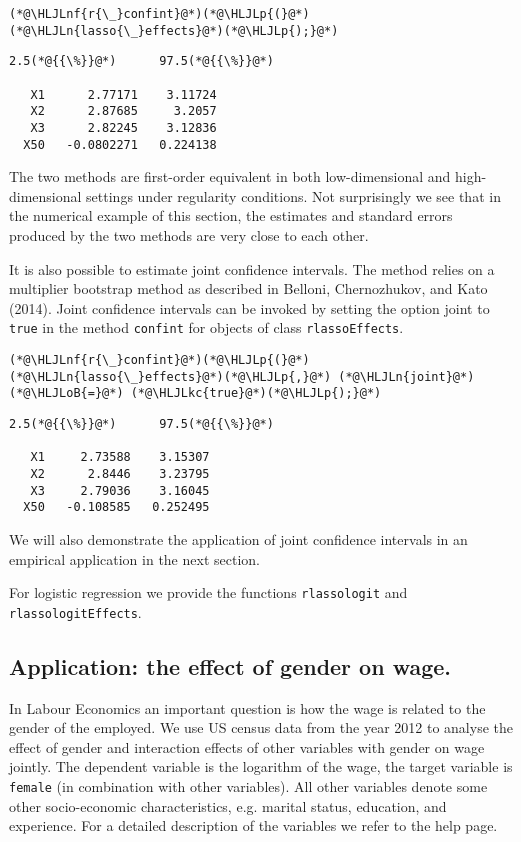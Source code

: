\documentclass[12pt,a4paper]{article}
\newcommand{\HLJLkc}[1]{\textcolor[RGB]{59,151,46}{\textit{#1}}}
\newcommand{\HLJLn}[1]{#1}
\newcommand{\HLJLnf}[1]{\textcolor[RGB]{66,102,213}{#1}}
\newcommand{\HLJLoB}[1]{\textcolor[RGB]{102,102,102}{\textbf{#1}}}
\newcommand{\HLJLp}[1]{#1}
\begin{document}
\begin{lstlisting}
(*@\HLJLnf{r{\_}confint}@*)(*@\HLJLp{(}@*)(*@\HLJLn{lasso{\_}effects}@*)(*@\HLJLp{);}@*)
\end{lstlisting}

\begin{lstlisting}
2.5(*@{{\%}}@*)      97.5(*@{{\%}}@*)

   X1      2.77171    3.11724
   X2      2.87685     3.2057
   X3      2.82245    3.12836
  X50   -0.0802271   0.224138
\end{lstlisting}


The two methods are first-order equivalent in both low-dimensional and high-dimensional settings under regularity conditions. Not surprisingly we see that in the numerical example of this section, the estimates and standard errors produced by the two methods are very close to each other.

It is also possible to estimate joint confidence intervals. The method relies on a multiplier bootstrap method as described in Belloni, Chernozhukov, and Kato (2014). Joint confidence intervals can be invoked by setting the option joint to \texttt{true} in the method \texttt{confint} for objects of class \texttt{rlassoEffects}.


\begin{lstlisting}
(*@\HLJLnf{r{\_}confint}@*)(*@\HLJLp{(}@*)(*@\HLJLn{lasso{\_}effects}@*)(*@\HLJLp{,}@*) (*@\HLJLn{joint}@*) (*@\HLJLoB{=}@*) (*@\HLJLkc{true}@*)(*@\HLJLp{);}@*)
\end{lstlisting}

\begin{lstlisting}
2.5(*@{{\%}}@*)      97.5(*@{{\%}}@*)

   X1     2.73588    3.15307
   X2      2.8446    3.23795
   X3     2.79036    3.16045
  X50   -0.108585   0.252495
\end{lstlisting}


We will also demonstrate the application of joint confidence intervals in an empirical application in the next section.

% 
For logistic regression we provide the functions \texttt{rlassologit} and \texttt{rlassologitEffects}.

\subsection{Application: the effect of gender on wage.}
In Labour Economics an important question is how the wage is related to the gender of the employed. We use US census data from the year 2012 to analyse the effect of gender and interaction effects of other variables with gender on wage jointly. The dependent variable is the logarithm of the wage, the target variable is \texttt{female} (in combination with other variables). All other variables denote some other socio-economic characteristics, e.g. marital status, education, and experience. For a detailed description of the variables we refer to the help page.
\end{document}
